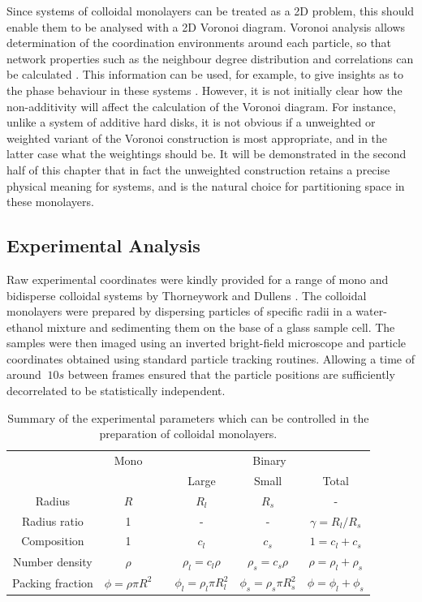 Since systems of colloidal monolayers can be treated as a 2D problem, this should enable them to be analysed with a 2D Voronoi diagram.
Voronoi analysis allows determination of the coordination environments around each particle, so that network properties such as the neighbour degree distribution and correlations can be calculated \cite{Earnshaw1994,Yang2002,Kumar2005,Chremos2007}.
This information can be used, for example, to give insights as to the phase behaviour in these systems \cite{Jaster1999,Pronk2004,Kapfer2015,Thorneywork2017}.
However, it is not initially clear how the non\--additivity will affect the calculation of the Voronoi diagram.
For instance, unlike a system of additive hard disks, it is not obvious if a unweighted or weighted variant of the Voronoi construction is most appropriate, and in the latter case what the weightings should be.
It will be demonstrated in the second half of this chapter that in fact the unweighted construction retains a precise physical meaning for \qtd{} systems, and is the natural choice for partitioning space in these monolayers.

\subsection{Experimental Analysis}
\label{s:expcolloidanalysis}

Raw experimental coordinates were kindly provided for a range of mono and bidisperse colloidal systems by Thorneywork and Dullens \cite{Thorneywork2014,Thorneywork2017,alice2015a}.
The colloidal monolayers were prepared by dispersing particles of specific radii in a water\--ethanol mixture and sedimenting them on the base of a glass sample cell.
The samples were then imaged using an inverted bright-field microscope and particle coordinates obtained using standard particle tracking routines.
Allowing a time of around $~10s$ between frames ensured that the particle positions are sufficiently decorrelated to be statistically independent. 

\begin{table}
\centering
\caption{Summary of the experimental parameters which can be controlled in the preparation of colloidal monolayers.}
\label{tab:expcolloidparams}
\begin{tabular}{@{}cccccc@{}}
\toprule
& \multicolumn{1}{c}{Mono} & \phantom{x} & \multicolumn{3}{c}{Binary} \\ 
\cmidrule{2-2} \cmidrule{4-6} 
& & & Large & Small & Total \\ 
\midrule
Radius & $R$ & & $R_l$ & $R_s$ & - \\
Radius ratio & 1 & & - & - & $\gamma=R_l/R_s$ \\
Composition & 1 & & $c_l$ & $c_s$ & $1=c_l+c_s$ \\
Number density & $\rho$ & & $\rho_l=c_l\rho$ & $\rho_s=c_s\rho$ & $\rho=\rho_l+\rho_s$ \\
Packing fraction & $\phi=\rho\pi R^2$ & & $\phi_l=\rho_l\pi R_l^2$ & $\phi_s=\rho_s\pi R_s^2$ & $\phi=\phi_l+\phi_s$ \\
\bottomrule
\end{tabular}
\end{table}

